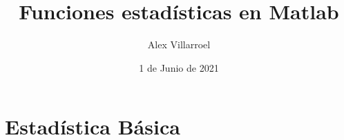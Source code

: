 \documentclass[11pt]{beamer}
\begin{document}
	\author{Alex Villarroel}
	\title{Funciones estadísticas en Matlab}
	\date{1 de Junio de 2021}
	\begin{frame}[plain]
		\maketitle
	\end{frame}
	\tableofcontents
	\section{Estadística Básica}
\end{document}
